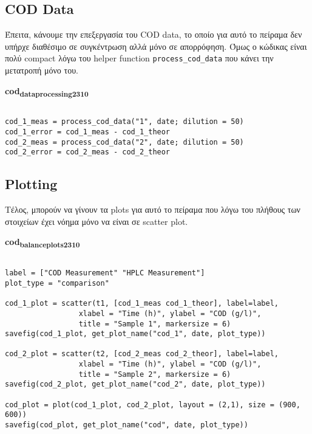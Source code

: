 \documentclass[11pt]{article}
\begin{document}
\subsection{COD Data}
\label{sec:orgb53dd91}
Έπειτα, κάνουμε την επεξεργασία του COD data, το οποίο για αυτό το πείραμα δεν υπήρχε διαθέσιμο σε συγκέντρωση αλλά μόνο σε απορρόφηση. Όμως ο κώδικας είναι πολύ compact λόγω του helper function \texttt{process\_cod\_data} που κάνει την μετατροπή μόνο του.

\textbf{cod\textsubscript{data}\textsubscript{processing}\textsubscript{23}\textsubscript{10}}
\begin{verbatim}

cod_1_meas = process_cod_data("1", date; dilution = 50)
cod_1_error = cod_1_meas - cod_1_theor
cod_2_meas = process_cod_data("2", date; dilution = 50)
cod_2_error = cod_2_meas - cod_2_theor

\end{verbatim}

\subsection{Plotting}
\label{sec:orga7d55cc}
Τέλος, μπορούν να γίνουν τα plots για αυτό το πείραμα που λόγω του πλήθους των στοιχείων έχει νόημα μόνο να είναι σε scatter plot.

\textbf{cod\textsubscript{balance}\textsubscript{plots}\textsubscript{23}\textsubscript{10}}
\begin{verbatim}

label = ["COD Measurement" "HPLC Measurement"]
plot_type = "comparison"

cod_1_plot = scatter(t1, [cod_1_meas cod_1_theor], label=label,
                 xlabel = "Time (h)", ylabel = "COD (g/l)",
                 title = "Sample 1", markersize = 6)
savefig(cod_1_plot, get_plot_name("cod_1", date, plot_type))

cod_2_plot = scatter(t2, [cod_2_meas cod_2_theor], label=label,
                 xlabel = "Time (h)", ylabel = "COD (g/l)",
                 title = "Sample 2", markersize = 6)
savefig(cod_2_plot, get_plot_name("cod_2", date, plot_type))

cod_plot = plot(cod_1_plot, cod_2_plot, layout = (2,1), size = (900, 600))
savefig(cod_plot, get_plot_name("cod", date, plot_type))

\end{verbatim}
\end{document}
